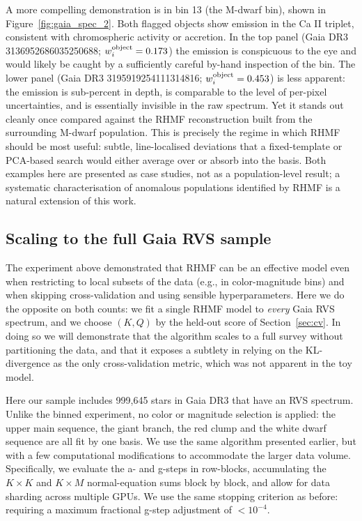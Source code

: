 \documentclass[onecolumn,floatfix,linenumbers,trackchanges]{aastex631}
\begin{document}
A more compelling demonstration is in bin 13 (the M-dwarf bin), shown in Figure~\ref{fig:gaia_spec_2}. Both flagged objects show emission in the Ca II triplet, consistent with chromospheric activity or accretion. In the top panel (Gaia DR3 3136952686035250688; $w_i^{\rm object} = 0.173$) the emission is conspicuous to the eye and would likely be caught by a sufficiently careful by-hand inspection of the bin. The lower panel (Gaia DR3 3195919254111314816; $w_i^{\rm object} = 0.453$) is less apparent: the emission is sub-percent in depth, is comparable to the level of per-pixel uncertainties, and is essentially invisible in the raw spectrum. Yet it stands out cleanly once compared against the RHMF reconstruction built from the surrounding M-dwarf population. This is precisely the regime in which RHMF should be most useful: subtle, line-localised deviations that a fixed-template or PCA-based search would either average over or absorb into the basis. Both examples here are presented as case studies, not as a population-level result; a systematic characterisation of anomalous populations identified by RHMF is a natural extension of this work.

\subsection{Scaling to the full Gaia RVS sample} \label{sec:gaia_full}

The experiment above demonstrated that RHMF can be an effective model even when restricting to local subsets of the data (e.g., in color-magnitude bins) and when skipping cross-validation and using sensible hyperparameters.
Here we do the opposite on both counts: we fit a single RHMF model to \emph{every} Gaia RVS spectrum, and we choose $(K,Q)$ by the held-out score of Section~\ref{sec:cv}. In doing so we will demonstrate that the algorithm scales to a full survey without partitioning the data, and that it exposes a subtlety in relying on the KL-divergence as the only cross-validation metric, which was not apparent in the toy model. 

Here our sample includes 999,645 stars in Gaia DR3 that have an RVS spectrum.
Unlike the binned experiment, no color or magnitude selection is applied: the upper main sequence, the giant branch, the red clump and the white dwarf sequence are all fit by one basis. We use the same algorithm presented earlier, but with a few computational modifications to accommodate the larger data volume. Specifically, we evaluate the a- and g-steps in row-blocks, accumulating the $K\times K$ and $K\times M$ normal-equation sums block by 
block, and allow for data sharding across multiple GPUs. We use the same stopping criterion as before: requiring a maximum fractional g-step adjustment of $<10^{-4}$.
\end{document}
